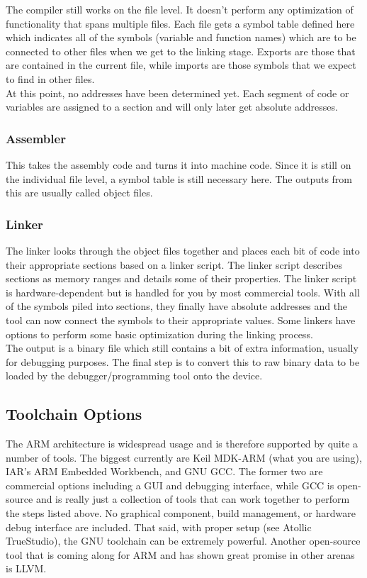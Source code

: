 \documentclass[10pt]{article}
\begin{document}
The compiler still works on the file level. It doesn't perform any optimization of functionality that spans multiple files. Each file gets a symbol table defined here which indicates all of the symbols (variable and function names) which are to be connected to other files when we get to the linking stage. Exports are those that are contained in the current file, while imports are those symbols that we expect to find in other files. \\
At this point, no addresses have been determined yet. Each segment of code or variables are assigned to a section and will only later get absolute addresses.

\subsubsection*{Assembler}
This takes the assembly code and turns it into machine code. Since it is still on the individual file level, a symbol table is still necessary here. The outputs from this are usually called object files.

\subsubsection*{Linker}
The linker looks through the object files together and places each bit of code into their appropriate sections based on a linker script. The linker script describes sections as memory ranges and details some of their properties. The linker script is hardware-dependent but is handled for you by most commercial tools. With all of the symbols piled into sections, they finally have absolute addresses and the tool can now connect the symbols to their appropriate values. Some linkers have options to perform some basic optimization during the linking process. \\

The output is a binary file which still contains a bit of extra information, usually for debugging purposes. The final step is to convert this to raw binary data to be loaded by the debugger/programming tool onto the device.

\subsection{Toolchain Options}
The ARM architecture is widespread usage and is therefore supported by quite a number of tools. The biggest currently are Keil MDK-ARM (what you are using), IAR’s ARM Embedded Workbench, and GNU GCC. The former two are commercial options including a GUI and debugging interface, while GCC is open-source and is really just a collection of tools that can work together to perform the steps listed above. No graphical component, build management, or hardware debug interface are included. That said, with proper setup (see Atollic TrueStudio), the GNU toolchain can be extremely powerful. Another open-source tool that is coming along for ARM and has shown great promise in other arenas is LLVM. \\
\end{document}
